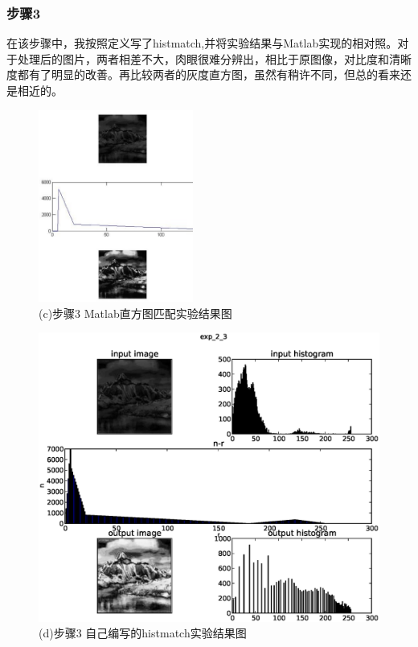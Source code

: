 \documentclass[]{IEEEphot}
\begin{document}
\subsubsection{步骤3}
在该步骤中，我按照定义写了histmatch,并将实验结果与Matlab实现的相对照。对于处理后的图片，两者相差不大，肉眼很难分辨出，相比于原图像，对比度和清晰度都有了明显的改善。再比较两者的灰度直方图，虽然有稍许不同，但总的看来还是相近的。
\begin{figure}[h]
	\includegraphics[width=12pc]{mexp_2_3.eps}
	\caption{(c)步骤3 Matlab直方图匹配实验结果图}
\end{figure}
\begin{figure}[h]
	\centering
	\includegraphics[width=30pc]{exp_2_3.eps}
	\caption{(d)步骤3 自己编写的histmatch实验结果图}
\end{figure}
\end{document}
